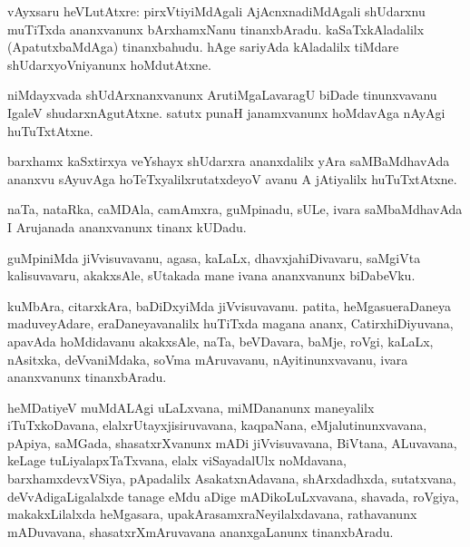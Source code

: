 \documentclass{article}
\begin{document}
\begin{mn}
vAyxsaru heVLutAtxre: pirxVtiyiMdAgali AjAcnxnadiMdAgali shUdarxnu muTiTxda ananxvanunx 
bArxhamxNanu tinanxbAradu. kaSaTxkAladalilx (ApatutxbaMdAga) tinanxbahudu. hAge sariyAda 
kAladalilx tiMdare shUdarxyoVniyanunx hoMdutAtxne.
\end{mn}

\begin{mn}
niMdayxvada shUdArxnanxvanunx ArutiMgaLavaragU biDade tinunxvavanu IgaleV shudarxnAgutAtxne. 
satutx punaH janamxvanunx hoMdavAga nAyAgi huTuTxtAtxne.
\end{mn}

\begin{mn}
barxhamx kaSxtirxya veYshayx shUdarxra ananxdalilx yAra saMBaMdhavAda ananxvu sAyuvAga 
hoTeTxyalilxrutatxdeyoV avanu A jAtiyalilx  huTuTxtAtxne.
\end{mn}

\begin{mn}
naTa, nataRka, caMDAla, camAmxra, guMpinadu, sULe, ivara saMbaMdhavAda I Arujanada ananxvanunx 
tinanx kUDadu.
\end{mn}

\begin{mn}
guMpiniMda jiVvisuvavanu, agasa, kaLaLx, dhavxja{}hiDivavaru, saMgiVta kalisuvavaru, akakxsAle, 
sUtakada mane ivana ananxvanunx biDabeVku.
\end{mn}

\begin{mn}
kuMbAra, citarxkAra, baDiDxyiMda jiVvisuvavanu. patita, heMgasueraDaneya maduveyAdare, 
eraDaneyavanalilx huTiTxda magana  ananx, CatirxhiDiyuvana, apavAda hoMdidavanu akakxsAle, naTa, 
beVDavara, baMje, roVgi, kaLaLx, nAsitxka, deVvaniMdaka, soVma mAruvavanu, nAyitinunxvavanu, 
ivara ananxvanunx tinanxbAradu.
\end{mn}

\begin{mn}
heMDatiyeV muMdALAgi uLaLxvana, miMDananunx maneyalilx iTuTxkoDavana, elalxrUtayxjisiruvavana, 
kaqpaNana, eMjalutinunxvavana, pApiya, saMGada, shasatxrXvanunx mADi jiVvisuvavana, BiVtana, 
ALuvavana, keLage tuLiyalapxTaTxvana, elalx viSayadalUlx noMdavana, barxhamxdevxVSiya, 
pApadalilx AsakatxnAdavana, shArxdadhxda, sutatxvana, deVvAdigaLigalalxde tanage eMdu aDige 
mADikoLuLxvavana, shavada, roVgiya, makakxLilalxda heMgasara, upakArasamxraNeyilalxdavana, 
rathavanunx mADuvavana, shasatxrXmAruvavana ananxgaLanunx tinanxbAradu.
\end{mn}
\end{document}
